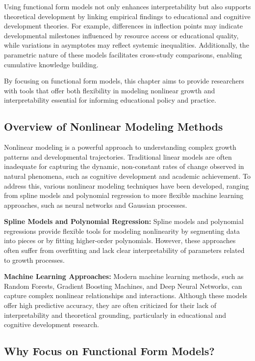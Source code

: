 \documentclass[
  letterpaper,
  DIV=11,
  numbers=noendperiod]{scrreprt}
\begin{document}
Using functional form models not only enhances interpretability but also
supports theoretical development by linking empirical findings to
educational and cognitive development theories. For example, differences
in inflection points may indicate developmental milestones influenced by
resource access or educational quality, while variations in asymptotes
may reflect systemic inequalities. Additionally, the parametric nature
of these models facilitates cross-study comparisons, enabling cumulative
knowledge building.

By focusing on functional form models, this chapter aims to provide
researchers with tools that offer both flexibility in modeling nonlinear
growth and interpretability essential for informing educational policy
and practice.

\subsection{Overview of Nonlinear Modeling
Methods}\label{overview-of-nonlinear-modeling-methods}

Nonlinear modeling is a powerful approach to understanding complex
growth patterns and developmental trajectories. Traditional linear
models are often inadequate for capturing the dynamic, non-constant
rates of change observed in natural phenomena, such as cognitive
development and academic achievement. To address this, various nonlinear
modeling techniques have been developed, ranging from spline models and
polynomial regression to more flexible machine learning approaches, such
as neural networks and Gaussian processes.

\textbf{Spline Models and Polynomial Regression:} Spline models and
polynomial regressions provide flexible tools for modeling nonlinearity
by segmenting data into pieces or by fitting higher-order polynomials.
However, these approaches often suffer from overfitting and lack clear
interpretability of parameters related to growth processes.

\textbf{Machine Learning Approaches:} Modern machine learning methods,
such as Random Forests, Gradient Boosting Machines, and Deep Neural
Networks, can capture complex nonlinear relationships and interactions.
Although these models offer high predictive accuracy, they are often
criticized for their lack of interpretability and theoretical grounding,
particularly in educational and cognitive development research.

\subsection{Why Focus on Functional Form
Models?}\label{why-focus-on-functional-form-models}
\end{document}
